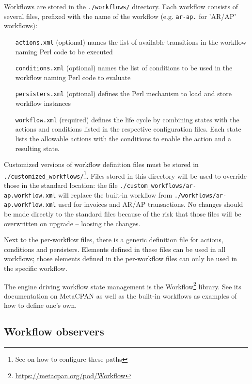 Workflows are stored in the \texttt{./workflows/} directory.  Each workflow consists of
several files, prefixed with the name of the workflow (e.g. \texttt{ar-ap.} for 'AR/AP' workflows):

\begin{enumerate}
	\item [\texttt{actions.xml}] (optional) names the list of available transitions
	in the workflow naming Perl code to be executed
	\item [\texttt{conditions.xml}] (optional) names the list of conditions to be used
	in the workflow naming Perl code to evaluate
	\item [\texttt{persisters.xml}] (optional) defines the Perl mechanism to load and store
	workflow instances
	\item [\texttt{workflow.xml}] (required) defines the life cycle by combining states with
	the actions and conditions listed in the respective configuration files. Each state lists
	the allowable actions with the conditions to enable the action and a resulting state.
\end{enumerate}

Customized versions of workflow definition files must be stored in
 \texttt{./customized\_workflows/}\footnote{See
 	 on how to configure
 these paths}.  Files stored in this directory will be used to override those in
the standard location: the file \texttt{./custom\_workflows/ar-ap.workflow.xml} will replace the built-in workflow
from \texttt{./workflows/ar-ap.workflow.xml} used for invoices and AR/AP transactions.
No changes should be made directly to the standard files because of the risk that those
files will be overwritten on upgrade -- loosing the changes.

Next to the per-workflow files, there is a generic definition file for actions,
conditions and persisters.  Elements defined in these files can be used in all
workflows; those elements defined in the per-workflow files can only be used
in the specific workflow.

The engine driving workflow state management is the
Workflow\footnote{\url{https://metacpan.org/pod/Workflow}} library.  See its
documentation on MetaCPAN as well as the built-in workflows as examples of how
to define one's own.

\subsection{Workflow observers}
\label{subsec-customization-workflow-observers}

